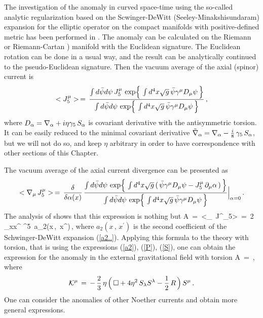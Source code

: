 The investigation of the anomaly in curved space-time
using the so-called analytic regularization based on the 
Scwinger-DeWitt (Seeley-Minakshisundaram) expansion 
for the elliptic operator on the compact manifolds with 
positive-defined metric has been performed in \cite{romsch}. 
The anomaly can be calculated on the Riemann or Riemann-Cartan 
\cite{obukhov-spectr}) manifold with the Euclidean signature. 
The Euclidean rotation 
can be done in a usual way, and the result can be analytically 
continued to the pseudo-Euclidean signature. Then the vacuum 
average of the axial (spinor) current is 
$$ %
<J^\mu_5> \,=\, 
\frac{\int d{\bar \psi} d \psi\,J^\mu_5\,\,{\rm exp} 
\Big\{\,\int d^4x\sqrt{g}\,{\bar \psi} \ga^\mu D_\mu \psi\,\Big\}}
{\int d{\bar \psi} d \psi\,\,{\rm exp}\Big\{\,\int d^4x\sqrt{g}
\,{\bar \psi} \ga^\mu D_\mu \psi\,\Big\}}\,,
$$ %
where $D_\alpha = \nabla_\alpha + i\eta\gamma_5\,S_\alpha$ is covariant 
derivative with the antisymmetric torsion. It can 
be easily reduced to the minimal covariant derivative
${\tilde {\nabla}}_\alpha = \nabla_\alpha - \frac{i}{8}\,\gamma_5\,S_\alpha$,
but we will not do so, and keep $\eta$ arbitrary in order
to have correspondence with other sections of this Chapter. 

The vacuum average of the axial current divergence 
can be presented as \cite{romsch,obukhov-spectr} 
$$ %
<\na_\mu\, J^\mu_5> \,=\, \frac{\de}{\de \al(x)}\,
\frac{\int d{\bar \psi} d \psi\,\,{\rm exp} \Big\{\,
\int d^4x\sqrt{g}\,(\,{\bar \psi} \ga^\mu D_\mu \psi
-J^\mu_5\,\pa_\mu \al\,)\,\Big\}}
{\int d{\bar \psi} d \psi\,\,{\rm exp}\Big\{
\,\int d^4x\sqrt{g}\,
{\bar \psi} \ga^\mu D_\mu \psi\,\Big\}}\Big|_{\al=0}\,.
$$ %
The analysis of \cite{romsch,obukhov-spectr} shows that
this expression is nothing but 
\beq
{\cal A} \,=\,
<\na_\mu\, J^\mu_5> \,=\, 2\,\lim_{x\to x^\prime}\,\tr \,\ga^5\,
a_2(x\,,\, x^\prime)\,,
\label{anom}
\eeq
where $a_2(x\,,\, x^\prime)$ is the second coefficient of the 
Schwinger-DeWitt expansion (\ref{a2..}). 
Applying this formula to the 
theory with torsion, that is using the expressions (\ref{a2}),
(\ref{P}), (\ref{S}), one can obtain the expression for the
anomaly in the external gravitational field with torsion
\cite{obukhov-spectr} 
\beq
{\cal A} \,=\,\,\,,
\label{anomal}
\eeq
where 
$$
{\cal K}^\mu \,=\,-\,\frac23\,\eta\,\Big(\,{\Box} 
+ 4\eta^2\,S_\lambda S^\lambda - \frac12\,R\,\Big)\,S^\mu\,.
$$
One can 
consider the anomalies of other Noether currents  
\cite{coggia} and obtain more general expressions.

